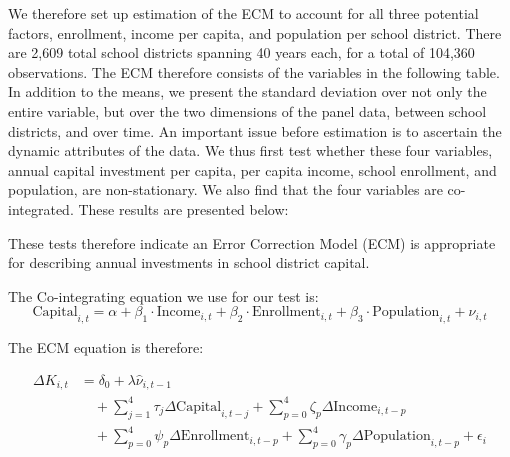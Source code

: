 We therefore set up estimation of the ECM to account for all three potential factors, enrollment, income per capita, and population per school district. There are 2,609 total school districts spanning 40 years each, for a total of 104,360 observations. The ECM therefore consists of the variables in the following table. In addition to the means, we present the standard deviation over not only the entire variable, but over the two dimensions of the panel data, between school districts, and over time. An important issue before estimation is to ascertain the dynamic attributes of the data. We thus first test whether these four variables, annual capital investment per capita, per capita income, school enrollment, and population, are non-stationary. We also find that the four variables are co-integrated. These results are presented below: 

\begin{table}[H]
    \centering

\end{table}

\begin{table}[H]
    \centering

\end{table}

These tests therefore indicate an Error Correction Model (ECM) is appropriate for describing annual investments in school district capital.

The Co-integrating equation we use for our test is: 
\begin{equation} 
 \text{Capital}_{i,t} = \alpha + \beta_1 \cdot \text{Income}_{i,t} + \beta_2 \cdot \text{Enrollment}_{i,t} + \beta_3 \cdot \text{Population}_{i,t} + \nu_{i,t}
\end{equation}

The ECM equation is therefore:

\begin{equation}
\begin{aligned}
    \Delta K_{i,t} &= \delta_0 + \lambda \hat{\nu}_{i,t-1} \\
    &\quad + \sum_{j=1}^{4} \tau_j \Delta \text{Capital}_{i,t-j} + \sum_{p=0}^{4} \zeta_p \Delta \text{Income}_{i,t-p} \\
    &\quad + \sum_{p=0}^{4} \psi_p \Delta \text{Enrollment}_{i,t-p} + \sum_{p=0}^{4} \gamma_p \Delta \text{Population}_{i,t-p} + \epsilon_i
\end{aligned}
\end{equation}


